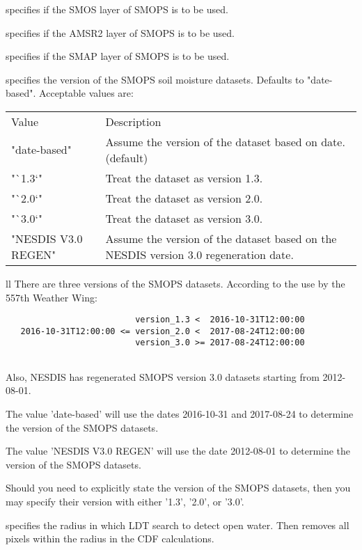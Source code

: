 specifies if the SMOS layer of SMOPS is to be used.

 specifies if the AMSR2 layer of SMOPS is to be used.

 specifies if the SMAP layer of SMOPS is to be used.

  specifies the version of the SMOPS
 soil moisture datasets.
 Defaults to "date-based".
 Acceptable values are:

 \begin{tabular}{ll}
 Value               & Description \\
 "date-based"        & Assume the version of the dataset based on date.
                       (default) \\
 "`1.3`"             & Treat the dataset as version 1.3. \\
 "`2.0`"             & Treat the dataset as version 2.0. \\
 "`3.0`"             & Treat the dataset as version 3.0. \\
 "NESDIS V3.0 REGEN" & Assume the version of the dataset based on the
                       NESDIS version 3.0 regeneration date. \\
 \end{tabular}{ll}
 There are three versions of the SMOPS datasets.  According to the
 use by the 557th Weather Wing:
 

 \begin{verbatim}
                          version_1.3 <  2016-10-31T12:00:00
   2016-10-31T12:00:00 <= version_2.0 <  2017-08-24T12:00:00
                          version_3.0 >= 2017-08-24T12:00:00
 
 \end{verbatim}

 Also, NESDIS has regenerated SMOPS version 3.0 datasets starting
 from 2012-08-01.
 
 The value 'date-based' will use the dates 2016-10-31 and 2017-08-24
 to determine the version of the SMOPS datasets.
 
 The value 'NESDIS V3.0 REGEN' will use the date 2012-08-01
 to determine the version of the SMOPS datasets.
 
 Should you need to explicitly state the version of the SMOPS datasets,
 then you may specify their version with either '1.3', '2.0', or '3.0'.

 specifies the radius in which LDT search to detect open water.
 Then removes all pixels within the radius in the CDF calculations.
 

